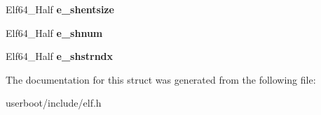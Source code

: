 \begin{DoxyCompactItemize}
\item 
Elf64\+\_\+\+Half {\bfseries e\+\_\+shentsize}\hypertarget{structElf64__Ehdr_a078af1eaf7681f9d85ff545b6c7aa9c5}{}\label{structElf64__Ehdr_a078af1eaf7681f9d85ff545b6c7aa9c5}

\item 
Elf64\+\_\+\+Half {\bfseries e\+\_\+shnum}\hypertarget{structElf64__Ehdr_a317679f1ef5e41e0717e95670c6a1d24}{}\label{structElf64__Ehdr_a317679f1ef5e41e0717e95670c6a1d24}

\item 
Elf64\+\_\+\+Half {\bfseries e\+\_\+shstrndx}\hypertarget{structElf64__Ehdr_ae8289d7705794be744876f6246242b9b}{}\label{structElf64__Ehdr_ae8289d7705794be744876f6246242b9b}

\end{DoxyCompactItemize}


The documentation for this struct was generated from the following file\+:\begin{DoxyCompactItemize}
\item 
userboot/include/elf.\+h\end{DoxyCompactItemize}
